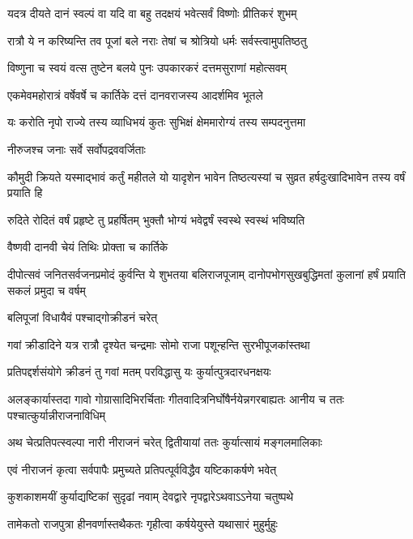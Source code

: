 \twolineshloka
{यदत्र दीयते दानं स्वल्पं वा यदि वा बहु}
{तदक्षयं भवेत्सर्वं विष्णोः प्रीतिकरं शुभम्} %

\twolineshloka
{रात्रौ ये न करिष्यन्ति तव पूजां बले नराः}
{तेषां च श्रोत्रियो धर्मः सर्वस्त्वामुपतिष्ठतु} %

\twolineshloka
{विष्णुना च स्वयं वत्स तुष्टेन बलये पुनः}
{उपकारकरं दत्तमसुराणां महोत्सवम्} %

\twolineshloka
{एकमेवमहोरात्रं वर्षेवर्षे च कार्तिके}
{दत्तं दानवराजस्य आदर्शमिव भूतले} %

\twolineshloka
{यः करोति नृपो राज्ये तस्य व्याधिभयं कुतः}
{सुभिक्षं क्षेममारोग्यं तस्य सम्पदनुत्तमा} %


\onelineshloka
{नीरुजश्च जनाः सर्वे सर्वोपद्रववर्जिताः} %

\threelineshloka
{कौमुदी क्रियते यस्माद्भावं कर्तुं महीतले}
{यो यादृशेन भावेन तिष्ठत्यस्यां च सुव्रत}
{हर्षदुःखादिभावेन तस्य वर्षं प्रयाति हि} %

\twolineshloka
{रुदिते रोदितं वर्षं प्रहृष्टे तु प्रहर्षितम्}
{भुक्तौ भोग्यं भवेद्वर्षं स्वस्थे स्वस्थं भविष्यति} %


\onelineshloka
{वैष्णवी दानवी चेयं तिथिः प्रोक्ता च कार्तिके} %

\fourlineindentedshloka
{दीपोत्सवं जनितसर्वजनप्रमोदं}
{कुर्वन्ति ये शुभतया बलिराजपूजाम्}
{दानोपभोगसुखबुद्धिमतां कुलानां}
{हर्षं प्रयाति सकलं प्रमुदा च वर्षम्} %


\onelineshloka
{बलिपूजां विधायैवं पश्चाद्गोक्रीडनं चरेत्} %

\twolineshloka
{गवां क्रीडादिने यत्र रात्रौ दृश्येत चन्द्रमाः}
{सोमो राजा पशून्हन्ति सुरभीपूजकांस्तथा} %

\twolineshloka
{प्रतिपद्दर्शसंयोगे क्रीडनं तु गवां मतम्}
{परविद्धासु यः कुर्यात्पुत्रदारधनक्षयः} %

\threelineshloka
{अलङ्कार्यास्तदा गावो गोग्रासादिभिरर्चिताः}
{गीतवादित्रनिर्घोषैर्नयेन्नगरबाह्यतः}
{आनीय च ततः पश्चात्कुर्यान्नीराजनाविधिम्} %

\twolineshloka
{अथ चेत्प्रतिपत्स्वल्पा नारी नीराजनं चरेत्}
{द्वितीयायां ततः कुर्यात्सायं मङ्गलमालिकाः} %

\twolineshloka
{एवं नीराजनं कृत्वा सर्वपापैः प्रमुच्यते}
{प्रतिपत्पूर्वविद्धैव यष्टिकाकर्षणे भवेत्} %

\twolineshloka
{कुशकाशमयीं कुर्याद्यष्टिकां सुदृढां नवाम्}
{देवद्वारे नृपद्वारेऽथवाऽऽनेया चतुष्पथे} %

\twolineshloka
{तामेकतो राजपुत्रा हीनवर्णास्तथैकतः}
{गृहीत्वा कर्षयेयुस्ते यथासारं मुहुर्मुहुः} %

